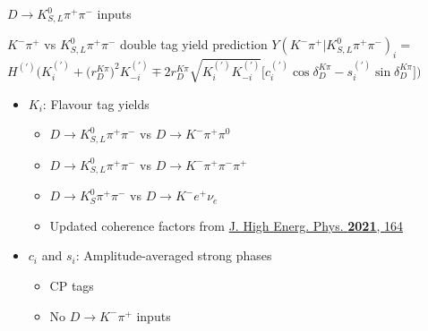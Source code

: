 \documentclass{beamer}
\begin{document}
\begin{frame}{$D\to K_{S, L}^0\pi^+\pi^-$ inputs}
  \begin{block}{$K^-\pi^+$ vs $K_{S, L}^0\pi^+\pi^-$ double tag yield prediction}
    $Y(K^-\pi^+|K_{S, L}^0\pi^+\pi^-)_i =$ \\ 
    $H^{(\prime)}\Big(K_i^{(\prime)} + \big(r_D^{K\pi}\big)^2K_{-i}^{(\prime)} \mp 2r_D^{K\pi}\sqrt{K_i^{(\prime)}K_{-i}^{(\prime)}}\big[c_i^{(\prime)}\cos\delta_D^{K\pi} - s_i^{(\prime)}\sin\delta_D^{K\pi}\big]\Big)$
  \end{block}
  \begin{itemize}
      \setlength\itemsep{1.0em}
    \item{$K_i$: Flavour tag yields}
    \begin{itemize}
      \setlength\itemsep{0.5em}
      \item{$D\to K_{S, L}^0\pi^+\pi^-$ vs $D\to K^-\pi^+\pi^0$}
      \item{$D\to K_{S, L}^0\pi^+\pi^-$ vs $D\to K^-\pi^+\pi^-\pi^+$}
      \item{$D\to K_S^0\pi^+\pi^-$ vs $D\to K^-e^+\nu_e$}
      \item{Updated coherence factors from \href{https://doi.org/10.1007/JHEP05(2021)164}{J. High Energ. Phys. \textbf{2021}, 164}}
    \end{itemize}
    \item{$c_i$ and $s_i$: Amplitude-averaged strong phases}
    \begin{itemize}
      \setlength\itemsep{0.5em}
      \item{CP tags}
      \item{No $D\to K^-\pi^+$ inputs}
    \end{itemize}
  \end{itemize}
\end{frame}
\end{document}
